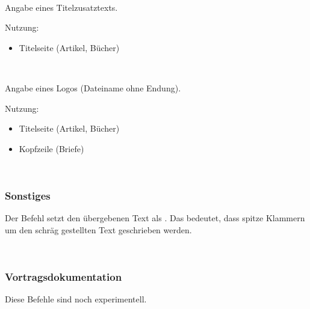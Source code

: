 \begin{nutzung}
		\>\\
	\beispiel
		\>
\end{nutzung}

\DescribeMacro{\titelzusatz}
Angabe eines Titelzusatztexts.

Nutzung:
\begin{itemize}
	\item Titelseite (Artikel, Bücher)
\end{itemize}

\begin{nutzung}
		\>\\
	\beispiel
		\>
\end{nutzung}

\DescribeMacro{\logo}
Angabe eines Logos (Dateiname ohne Endung).

Nutzung:
\begin{itemize}
	\item Titelseite (Artikel, Bücher)
	\item Kopfzeile (Briefe)
\end{itemize}

\begin{nutzung}
		\>\\
	\beispiel
		\>
\end{nutzung}


\subsubsection{Sonstiges}

\DescribeMacro{\meta}
Der Befehl  setzt den übergebenen Text als .
Das bedeutet, dass spitze Klammern um den schräg gestellten Text geschrieben werden.
\begin{nutzung}
		\>\\
	\beispiel
		\>
\end{nutzung}

\subsubsection{Vortragsdokumentation}

Diese Befehle sind noch experimentell.

